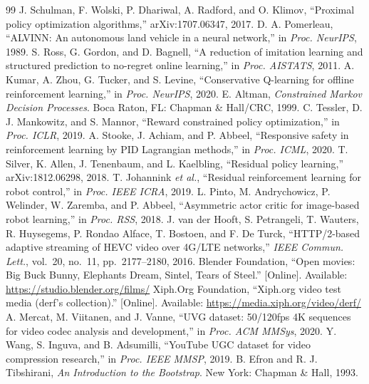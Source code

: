 \documentclass[conference]{IEEEtran}
\begin{document}
\begin{thebibliography}{99}
 J. Schulman, F. Wolski, P. Dhariwal, A. Radford, and O. Klimov, ``Proximal policy optimization algorithms,'' arXiv:1707.06347, 2017.
 D. A. Pomerleau, ``ALVINN: An autonomous land vehicle in a neural network,'' in \emph{Proc. NeurIPS}, 1989.
 S. Ross, G. Gordon, and D. Bagnell, ``A reduction of imitation learning and structured prediction to no-regret online learning,'' in \emph{Proc. AISTATS}, 2011.
 A. Kumar, A. Zhou, G. Tucker, and S. Levine, ``Conservative Q-learning for offline reinforcement learning,'' in \emph{Proc. NeurIPS}, 2020.
 E. Altman, \emph{Constrained Markov Decision Processes}. Boca Raton, FL: Chapman \& Hall/CRC, 1999.
 C. Tessler, D. J. Mankowitz, and S. Mannor, ``Reward constrained policy optimization,'' in \emph{Proc. ICLR}, 2019.
 A. Stooke, J. Achiam, and P. Abbeel, ``Responsive safety in reinforcement learning by PID Lagrangian methods,'' in \emph{Proc. ICML}, 2020.
 T. Silver, K. Allen, J. Tenenbaum, and L. Kaelbling, ``Residual policy learning,'' arXiv:1812.06298, 2018.
 T. Johannink \emph{et al.}, ``Residual reinforcement learning for robot control,'' in \emph{Proc. IEEE ICRA}, 2019.
 L. Pinto, M. Andrychowicz, P. Welinder, W. Zaremba, and P. Abbeel, ``Asymmetric actor critic for image-based robot learning,'' in \emph{Proc. RSS}, 2018.
 J. van der Hooft, S. Petrangeli, T. Wauters, R. Huysegems, P. Rondao Alface, T. Bostoen, and F. De Turck, ``HTTP/2-based adaptive streaming of HEVC video over 4G/LTE networks,'' \emph{IEEE Commun. Lett.}, vol.~20, no.~11, pp.~2177--2180, 2016.
 Blender Foundation, ``Open movies: Big Buck Bunny, Elephants Dream, Sintel, Tears of Steel.'' [Online]. Available: \url{https://studio.blender.org/films/}
 Xiph.Org Foundation, ``Xiph.org video test media (derf's collection).'' [Online]. Available: \url{https://media.xiph.org/video/derf/}
 A. Mercat, M. Viitanen, and J. Vanne, ``UVG dataset: 50/120fps 4K sequences for video codec analysis and development,'' in \emph{Proc. ACM MMSys}, 2020.
 Y. Wang, S. Inguva, and B. Adsumilli, ``YouTube UGC dataset for video compression research,'' in \emph{Proc. IEEE MMSP}, 2019.
 B. Efron and R. J. Tibshirani, \emph{An Introduction to the Bootstrap}. New York: Chapman \& Hall, 1993.
\end{thebibliography}
\end{document}
